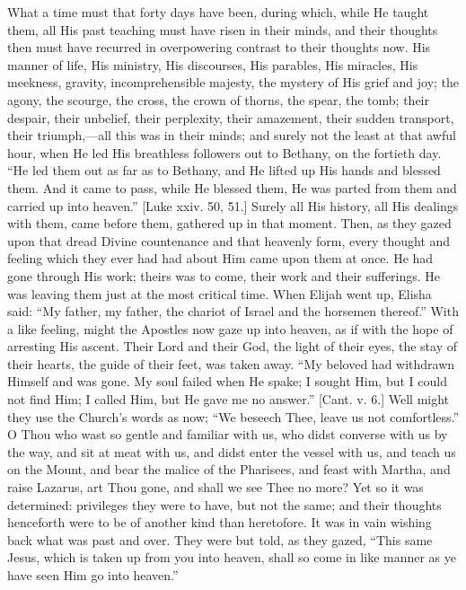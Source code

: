 What a time must that forty days have been, during which, while He
taught them, all His past teaching must have risen in their minds, and
their thoughts then must have recurred in overpowering contrast to
their thoughts now. His manner of life, His ministry, His discourses,
His parables, His miracles, His meekness, gravity, incomprehensible
majesty, the mystery of His grief and joy; the agony, the scourge, the
cross, the crown of thorns, the spear, the tomb; their despair, their
unbelief, their perplexity, their amazement, their sudden transport,
their triumph,—all this was in their minds; and surely not the least
at that awful hour, when He led His breathless followers out to
Bethany, on the fortieth day. ``He led them out as far as to
Bethany, and He lifted up His hands and blessed them. And it came to
pass, while He blessed them, He was parted from them and carried up
into heaven.'' [Luke xxiv. 50, 51.] Surely all His history, all
His dealings with them, came before them, gathered up in that moment.
Then, as they gazed upon that dread Divine countenance and that
heavenly form, every thought and feeling which they ever had had about
Him came upon them at once. He had gone through His work; theirs was
to come, their work and their sufferings. He was leaving them just at
the most critical time. When Elijah went up, Elisha said: ``My
father, my father, the chariot of Israel and the horsemen
thereof.'' With a like feeling, might the Apostles now gaze up
into heaven, as if with the hope of arresting His ascent. Their Lord
and their God, the light of their eyes, the stay of their hearts, the
guide of their feet, was taken away. ``My beloved had withdrawn
Himself and was gone. My soul failed when He spake; I sought Him, but
I could not find Him; I called Him, but He gave me no answer.''
[Cant. v. 6.] Well might they use the Church's words as now; ``We
beseech Thee, leave us not comfortless.'' O Thou who wast so
gentle and familiar with us, who didst converse with us by the way,
and sit at meat with us, and didst enter the vessel with us, and teach
us on the Mount, and bear the malice of the Pharisees, and feast with
Martha, and raise Lazarus, art Thou gone, and shall we see Thee no
more? Yet so it was determined: privileges they were to have, but not
the same; and their thoughts henceforth were to be of another kind
than heretofore. It was in vain wishing back what was past and over.
They were but told, as they gazed, ``This same Jesus, which is
taken up from you into heaven, shall so come in like manner as ye have
seen Him go into heaven.''

